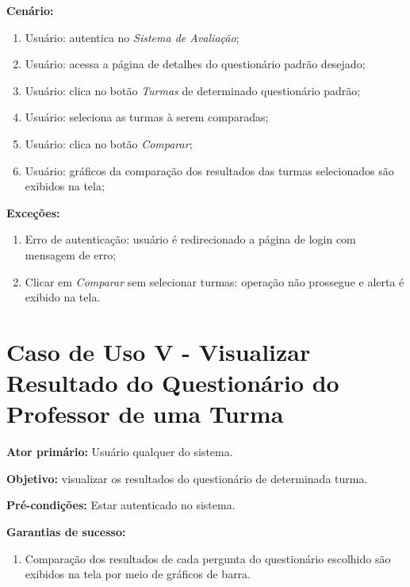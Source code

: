 \documentclass[
  12pt,       %
  openright,      %
  oneside,      %
  a4paper,      %
  english,      %
  french,        %
  spanish,     %
  brazil        %
  ]{abntex2-decsi}
\begin{document}
\begin{apendicesenv}
		\textbf{Cenário:}
		
		\begin{enumerate}
			\item Usuário: autentica no \textit{Sistema de Avaliação};           
			\item Usuário: acessa a página de detalhes do questionário padrão desejado;
            \item Usuário: clica no botão \textit{Turmas} de determinado questionário padrão;
            \item Usuário: seleciona as turmas à serem comparadas;
            \item Usuário: clica no botão \textit{Comparar};
			\item Usuário: gráficos da comparação dos resultados das turmas selecionados são exibidos na tela;
		\end{enumerate}
		
		\textbf{Exceções:}
		
			\begin{enumerate}	
				\item Erro de autenticação: usuário é redirecionado a página de login com mensagem de erro;
                \item Clicar em \textit{Comparar} sem selecionar turmas: operação não prossegue e alerta é exibido na tela.
			\end{enumerate}

	\newpage
    
    \section{Caso de Uso V - Visualizar Resultado do Questionário do Professor de uma Turma}
    
	\textbf{Ator primário:} Usuário qualquer do sistema.
				
    \textbf{Objetivo:} visualizar os resultados do questionário de determinada turma.
    
	\textbf{Pré-condições:} Estar autenticado no sistema.
		
	\textbf{Garantias de sucesso:} 
        
            \begin{enumerate}
            
            \item Comparação dos resultados de cada pergunta do questionário escolhido são exibidos na tela por meio de gráficos de barra.  
            
            \end{enumerate}
        

\end{apendicesenv}
\end{document}

